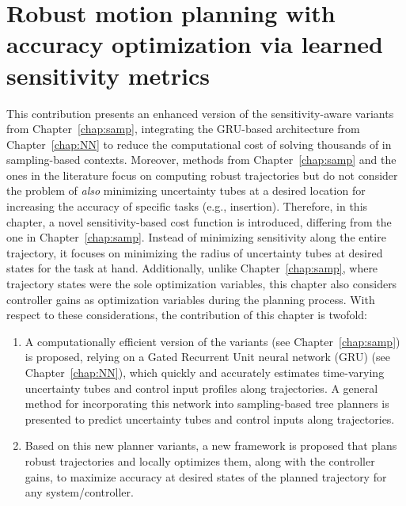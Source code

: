 \chapter{Robust motion planning with accuracy optimization via learned sensitivity metrics}\label{chap:sampNN}


This contribution presents an enhanced version of the sensitivity-aware variants from Chapter~\ref{chap:samp}, integrating the GRU-based architecture from Chapter~\ref{chap:NN} to reduce the computational cost of solving thousands of  in sampling-based contexts. 
Moreover, methods from Chapter~\ref{chap:samp} and the ones in the literature focus on computing robust trajectories but do not consider the problem of \emph{also} minimizing uncertainty tubes at a desired location for increasing the accuracy of specific tasks (e.g., insertion).
Therefore, in this chapter, a novel sensitivity-based cost function is introduced, differing from the one in Chapter~\ref{chap:samp}. 
Instead of minimizing sensitivity along the entire trajectory, it focuses on minimizing the radius of uncertainty tubes at desired states for the task at hand. 
Additionally, unlike Chapter~\ref{chap:samp}, where trajectory states were the sole optimization variables, this chapter also considers controller gains as optimization variables during the planning process.
With respect to these considerations, the contribution of this chapter is twofold:
\begin{enumerate}
    \item A computationally efficient version of the  variants (see Chapter~\ref{chap:samp}) is proposed, relying on a Gated Recurrent Unit neural network (GRU)\cite{cGRU} (see Chapter~\ref{chap:NN}), which quickly and accurately estimates time-varying uncertainty tubes and control input profiles along trajectories.
    A general method for incorporating this network into sampling-based tree planners is presented to predict uncertainty tubes and control inputs along trajectories.
    \item Based on this new planner variants, a new framework is proposed that plans robust trajectories and locally optimizes them, along with the controller gains, to maximize accuracy at desired states of the planned trajectory for any system/controller.
\end{enumerate}

